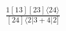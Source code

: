 \documentclass[varwidth, border=5pt]{standalone}
\begin{document}
\begin{my}
$\begin{gathered}
\scriptscriptstyle\frac{1[13][23]⟨24⟩}{[24]⟨2|3+4|2]}
\end{gathered}$
\end{my}
\end{document}
